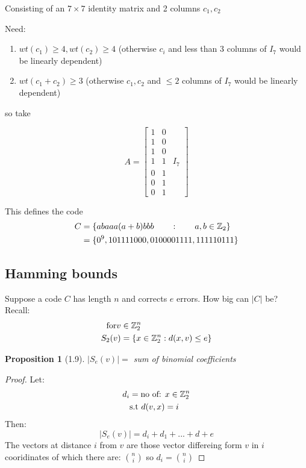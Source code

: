 \documentclass[]{amsart}
\newtheorem{prop}[thm]{Proposition}
\theoremstyle{definition}
\theoremstyle{remark}
\numberwithin{equation}{section}
\begin{document}
	Consisting of an $7 \times 7$ identity matrix and 2 columns $c_1, c_2$

	Need:
	\begin{enumerate}
		\item $wt(c_1)\geq 4, wt(c_2)\geq 4$ (otherwise $c_i$ and less than 3 columns of $I_7$ would be linearly dependent)
		\item $wt(c_1+ c_2) \geq 3$ (otherwise $c_1, c_2$ and $\leq 2$ columns of $I_7$ would be linearly dependent)	
	\end{enumerate}
	so take 

	\begin{equation*}
		A = \begin{bmatrix}
			1 & 0 \\
			1 & 0 \\
			1 & 0 \\
			1 & 1 & I_7 \\
			0 & 1 \\
			0 & 1 \\
			0 & 1 

			\end{bmatrix}
	\end{equation*}

	This defines the code
	\begin{align*}
		C &= \{ a b a a a (a +b)  b b b \qquad: \qquad a,b \in \mathbb{Z}_2 \} \\
		  &= \{0^9, 101111000, 0100001111, 111110111\}
	\end{align*}

\subsection{Hamming bounds}

Suppose a code $C$ has length $n$ and corrects $e$ errors. How big can $|C|$ be?\\

Recall: 
\begin{align*}
	\text{for} v &\in \mathbb{Z}_2^n \\
		S_2(v) &= \{x \in \mathbb{Z}_2^n: d(x,v)\leq e\}
\end{align*}

\begin{prop}[1.9]
	$|S_e(v)| = $ sum of binomial coefficients %
\end{prop}

\begin{proof}
	Let:
	\begin{align*}
		d_i &= \text{no of: } x\in \mathbb{Z}_2^n \\
			&\text{s.t } d(v,x) = i
	\end{align*}
	Then:
	\[ |S_e(v)| = d_i + d_1 + ... + d+e\]
	The vectors at distance $i$ from $v$ are those vector differeing form $v$ in $i$ cooridinates of which there are: ${n \choose i}$ so $d_i = {n \choose i}$
\end{proof}
\end{document}
